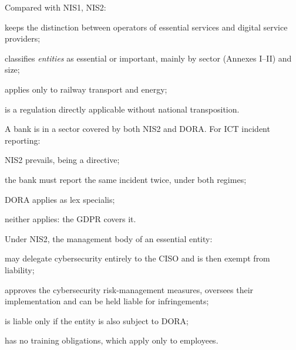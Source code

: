 \begin{domanda}\label{q:nis2-nis1}
Compared with NIS1, NIS2:
\begin{opzioni}
  \item keeps the distinction between operators of essential services and digital service providers;
  \item classifies \emph{entities} as essential or important, mainly by sector (Annexes I--II) and size;
  \item applies only to railway transport and energy;
  \item is a regulation directly applicable without national transposition.
\end{opzioni}
\end{domanda}

\begin{domanda}\label{q:lex-specialis}
A bank is in a sector covered by both NIS2 and DORA. For ICT incident reporting:
\begin{opzioni}
  \item NIS2 prevails, being a directive;
  \item the bank must report the same incident twice, under both regimes;
  \item DORA applies as lex specialis;
  \item neither applies: the GDPR covers it.
\end{opzioni}
\end{domanda}

\begin{domanda}\label{q:nis2-organo}
Under NIS2, the management body of an essential entity:
\begin{opzioni}
  \item may delegate cybersecurity entirely to the CISO and is then exempt from liability;
  \item approves the cybersecurity risk-management measures, oversees their implementation and can be
    held liable for infringements;
  \item is liable only if the entity is also subject to DORA;
  \item has no training obligations, which apply only to employees.
\end{opzioni}
\end{domanda}

